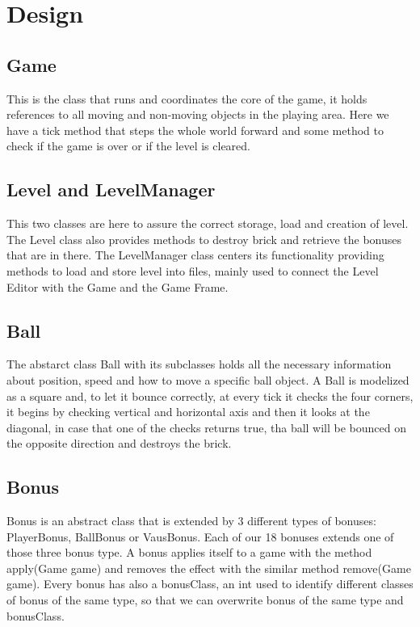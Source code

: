 \chapter*{Design}
\label{cha:design}

\section*{Game}
\label{sec:game}
This is the class that runs and coordinates the core of the game, it holds references to all moving and non-moving objects in the playing area. Here we have a tick method that steps the whole world forward and some method to check if the game is over or if the level is cleared.

\section*{Level and LevelManager}
\label{sec:level}
This two classes are here to assure the correct storage, load and creation of level. The Level class also provides methods to destroy brick and retrieve the bonuses that are in there. The LevelManager class centers its functionality providing methods to load and store level into files, mainly used to connect the Level Editor with the Game and the Game Frame.

\section*{Ball}
\label{sec:ball}
The abstarct class Ball with its subclasses holds all the necessary information about position, speed and how to move a specific ball object. A Ball is modelized as a square and, to let it bounce correctly, at every tick it checks the four corners, it begins by checking vertical and horizontal axis and then it looks at the diagonal, in case that one of the checks returns true, tha ball will be bounced on the opposite direction and destroys the brick.

\section*{Bonus}
\label{sec:bonus}
Bonus is an abstract class that is extended by 3 different types of bonuses: PlayerBonus, BallBonus or VausBonus. Each of our 18 bonuses extends one of those three bonus type. A bonus applies itself to a game with the method apply(Game game) and removes the effect with the similar method remove(Game game). Every bonus has also a bonusClass, an int used to identify different classes of bonus of the same type, so that we can overwrite bonus of the same type and bonusClass.

